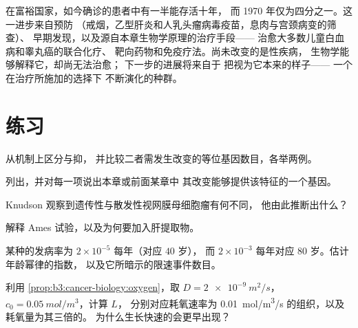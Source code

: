 \begin{remark}[变化之处]\label{rem:b3:cancer-biology:changed}
在富裕国家，如今确诊的患者中有一半能存活十年，
而 1970 年仅为四分之一。这一进步来自预防
（戒烟，乙型肝炎和人乳头瘤病毒疫苗，息肉与宫颈病变的筛查）、
早期发现，以及源自本章生物学原理的治疗手段——
治愈大多数儿童白血病和睾丸癌的联合化疗、
靶向药物和免疫疗法。尚未改变的是性疾病，
生物学能够解释它，却尚无法治愈；
下一步的进展将来自于
把视为它本来的样子——
一个在治疗所施加的选择下
不断演化的种群。
\end{remark}

\section{练习}

\begin{exercise}[$\star$]\label{exo:b3:cancer-biology:1}
从机制上区分与抑，
并比较二者需发生改变的等位基因数目，各举两例。
\end{exercise}

\begin{exercise}[$\star$]\label{exo:b3:cancer-biology:2}
列出，并对每一项说出本章或前面某章中
其改变能够提供该特征的一个基因。
\end{exercise}

\begin{exercise}[$\star$]\label{exo:b3:cancer-biology:3}
Knudson 观察到遗传性与散发性视网膜母细胞瘤有何不同，
他由此推断出什么？
\end{exercise}

\begin{exercise}[$\star$]\label{exo:b3:cancer-biology:4}
解释 Ames 试验，以及为何要加入肝提取物。
\end{exercise}

\begin{exercise}[$\star\star$]\label{exo:b3:cancer-biology:5}
某种的发病率为 $2\times 10^{-5}$ 每年（对应 $40$ 岁），
而 $2\times 10^{-3}$ 每年对应 $80$ 岁。估计年龄幂律的指数，
以及它所暗示的限速事件数目。
\end{exercise}

\begin{exercise}[$\star\star$]\label{exo:b3:cancer-biology:6}
利用 \cref{prop:b3:cancer-biology:oxygen}，取 $D =
\qty{2e-9}{m^2/s}$，$c_{0} = \qty{0.05}{mol/m^3}$，计算 $L$，
分别对应耗氧速率为 \qty{0.01}{mol/m^3/s} 的组织，以及耗氧量为其三倍的。
为什么生长快速的会更早出现？
\end{exercise}

